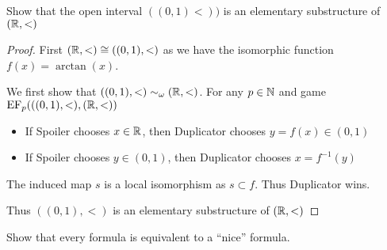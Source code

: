 \documentclass[11pt]{article}
\def \EF {\text{EF}}
\begin{document}
\begin{exercise}
Show that the open interval \(((0,1)<))\) is an elementary substructure of \((\mathbb{R},<)\)
\end{exercise}

\begin{proof}
First \((\mathbb{R},<)\cong((0,1),<)\) as we have the isomorphic function \(f(x)=\arctan(x)\).

We first show that \(((0,1),<)\sim_\omega(\mathbb{R},<)\). For any \(p\in\mathbb{N}\) and game \(\EF_p(((0,1),<),(\R,<))\)
\begin{itemize}
\item If Spoiler chooses \(x\in\mathbb{R}\), then Duplicator chooses \(y=f(x)\in(0,1)\)
\item If Spoiler chooses \(y\in(0,1)\), then Duplicator chooses \(x=f^{-1}(y)\)
\end{itemize}
The induced map \(s\) is a local isomorphism as \(s\subset f\). Thus Duplicator wins.

Thus \(((0,1),<)\) is an elementary substructure of \((\mathbb{R},<)\)
\end{proof}

\begin{exercise}
Show that every formula is equivalent to a ``nice'' formula.
\end{exercise}
\end{document}
